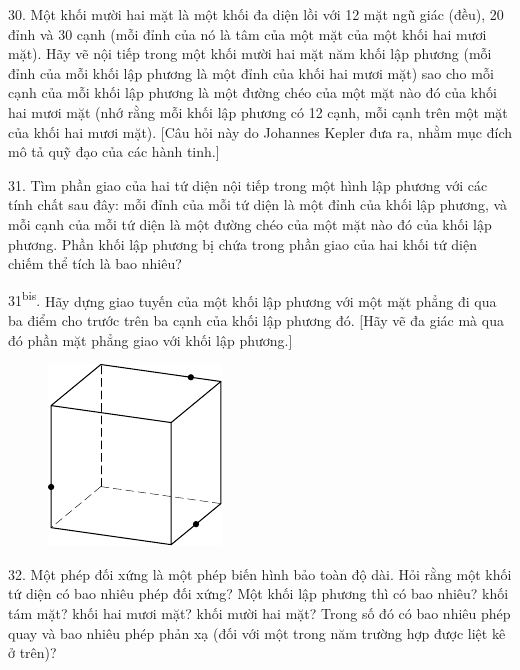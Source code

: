 \begin{problem}{30.}
	Một khối mười hai mặt là một khối đa diện lồi với 12 mặt ngũ giác (đều), 20 đỉnh và 30 cạnh (mỗi đỉnh của nó là tâm của một mặt của một khối hai mươi mặt). Hãy vẽ nội tiếp trong một khối mười hai mặt năm khối lập phương (mỗi đỉnh của mỗi khối lập phương là một đỉnh của khối hai mươi mặt) sao cho mỗi cạnh của mỗi khối lập phương là một đường chéo của một mặt nào đó của khối hai mươi mặt (nhớ rằng mỗi khối lập phương có 12 cạnh, mỗi cạnh trên một mặt của khối hai mươi mặt). [Câu hỏi này do Johannes Kepler đưa ra, nhằm mục đích mô tả quỹ đạo của các hành tinh.]
\end{problem}

\begin{problem}{31.}
	Tìm phần giao của hai tứ diện nội tiếp trong một hình lập phương với các tính chất sau đây: mỗi đỉnh của mỗi tứ diện là một đỉnh của khối lập phương, và mỗi cạnh của mỗi tứ diện là một đường chéo của một mặt nào đó của khối lập phương.
	Phần khối lập phương bị chứa trong phần giao của hai khối tứ diện chiếm thể tích là bao nhiêu?
\end{problem}

\begin{problem}{31\textsuperscript{bis}.}
	Hãy dựng giao tuyến của một khối lập phương với một mặt phẳng đi qua ba điểm cho trước trên ba cạnh của khối lập phương đó. [Hãy vẽ đa giác mà qua đó phần mặt phẳng giao với khối lập phương.]
	\begin{figure}
		\includegraphics{taskbook-15}
	\end{figure}
\end{problem}

\begin{problem}{32.}
	Một phép đối xứng là một phép biến hình bảo toàn độ dài. Hỏi rằng một khối tứ diện có bao nhiêu phép đối xứng? Một khối lập phương thì có bao nhiêu? khối tám mặt? khối hai mươi mặt? khối mười hai mặt? Trong số đó có bao nhiêu phép quay và bao nhiêu phép phản xạ (đối với một trong năm trường hợp được liệt kê ở trên)?
\end{problem}

